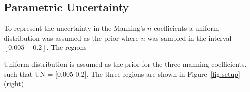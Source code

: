 \subsection{Parametric Uncertainty}
To represent the uncertainty in the Manning's $n$ coefficients a uniform distribution was assumed as the prior where $n$ was sampled in the interval $[0.005-0.2]$.  The regions

Uniform distribution is assumed as the prior for the three manning coefficients.
such that UN = [0.005-0.2]. The three regions are shown in Figure~\ref{fig:setup}(right)
